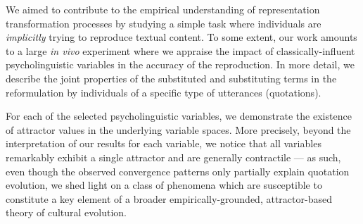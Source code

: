 We aimed to contribute to the empirical understanding of representation transformation processes %
 by studying a simple task where individuals are \emph{implicitly} trying to reproduce textual content. To some extent, our work amounts to a large \emph{in vivo} experiment where we appraise the impact of classically-influent psycholinguistic variables in the accuracy of the reproduction.
In more detail, we describe the joint properties of the substituted and substituting terms in the reformulation by individuals of a specific type of utterances (quotations). %


For each of the selected psycholinguistic variables, we demonstrate the existence of attractor values in the underlying variable spaces. More precisely, beyond the interpretation of our results for each variable, we notice that all variables remarkably exhibit a single attractor and are generally contractile --- as such, even though the observed convergence patterns only partially explain quotation evolution, we shed light on a class of phenomena which are susceptible to constitute a key element of a broader empirically-grounded, attractor-based theory of cultural evolution.





